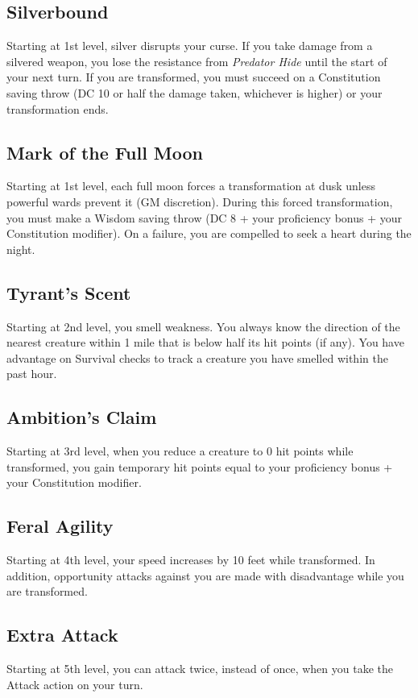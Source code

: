 \subsection*{Silverbound}
Starting at 1st level, silver disrupts your curse. If you take damage from a silvered weapon, you lose the resistance from \emph{Predator Hide} until the start of your next turn. If you are transformed, you must succeed on a Constitution saving throw (DC 10 or half the damage taken, whichever is higher) or your transformation ends.

\subsection*{Mark of the Full Moon}
Starting at 1st level, each full moon forces a transformation at dusk unless powerful wards prevent it (GM discretion). During this forced transformation, you must make a Wisdom saving throw (DC 8 + your proficiency bonus + your Constitution modifier). On a failure, you are compelled to seek a heart during the night.

\subsection*{Tyrant's Scent}
Starting at 2nd level, you smell weakness. You always know the direction of the nearest creature within 1 mile that is below half its hit points (if any). You have advantage on Survival checks to track a creature you have smelled within the past hour.

\subsection*{Ambition's Claim}
Starting at 3rd level, when you reduce a creature to 0 hit points while transformed, you gain temporary hit points equal to your proficiency bonus + your Constitution modifier.

\subsection*{Feral Agility}
Starting at 4th level, your speed increases by 10 feet while transformed. In addition, opportunity attacks against you are made with disadvantage while you are transformed.

\subsection*{Extra Attack}
Starting at 5th level, you can attack twice, instead of once, when you take the Attack action on your turn.


